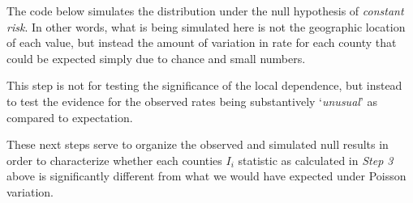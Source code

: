 \documentclass[
]{book}
\newenvironment{Shaded}{\begin{snugshade}}{\end{snugshade}}
\newcommand{\AttributeTok}[1]{\textcolor[rgb]{0.13,0.29,0.53}{#1}}
\newcommand{\CommentTok}[1]{\textcolor[rgb]{0.56,0.35,0.01}{\textit{#1}}}
\newcommand{\ControlFlowTok}[1]{\textcolor[rgb]{0.13,0.29,0.53}{\textbf{#1}}}
\newcommand{\DecValTok}[1]{\textcolor[rgb]{0.00,0.00,0.81}{#1}}
\newcommand{\FunctionTok}[1]{\textcolor[rgb]{0.13,0.29,0.53}{\textbf{#1}}}
\newcommand{\NormalTok}[1]{#1}
\newcommand{\OtherTok}[1]{\textcolor[rgb]{0.56,0.35,0.01}{#1}}
\newcommand{\SpecialCharTok}[1]{\textcolor[rgb]{0.81,0.36,0.00}{\textbf{#1}}}
\begin{document}
The code below simulates the distribution under the null hypothesis of \emph{constant risk}. In other words, what is being simulated here is not the geographic location of each value, but instead the amount of variation in rate for each county that could be expected simply due to chance and small numbers.

This step is not for testing the significance of the local dependence, but instead to test the evidence for the observed rates being substantively `\emph{unusual}' as compared to expectation.

\begin{Shaded}
\end{Shaded}

These next steps serve to organize the observed and simulated null results in order to characterize whether each counties \(I_i\) statistic as calculated in \emph{Step 3} above is significantly different from what we would have expected under Poisson variation.
\end{document}
